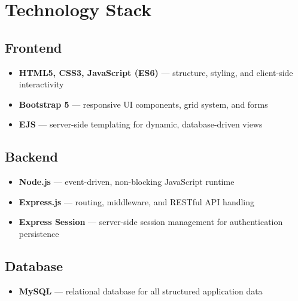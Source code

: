 \documentclass[11pt,a4paper]{report}
\begin{document}
\chapter{Technology Stack}

\section{Frontend}
\begin{itemize}[leftmargin=1.3em]
  \item \textbf{HTML5, CSS3, JavaScript (ES6)} --- structure, styling, and client-side interactivity
  \item \textbf{Bootstrap 5} --- responsive UI components, grid system, and forms
  \item \textbf{EJS} --- server-side templating for dynamic, database-driven views
\end{itemize}

\section{Backend}
\begin{itemize}[leftmargin=1.3em]
  \item \textbf{Node.js} --- event-driven, non-blocking JavaScript runtime
  \item \textbf{Express.js} --- routing, middleware, and RESTful API handling
  \item \textbf{Express Session} --- server-side session management for authentication persistence
\end{itemize}

\section{Database}
\begin{itemize}[leftmargin=1.3em]
  \item \textbf{MySQL} --- relational database for all structured application data
\end{itemize}
\end{document}

